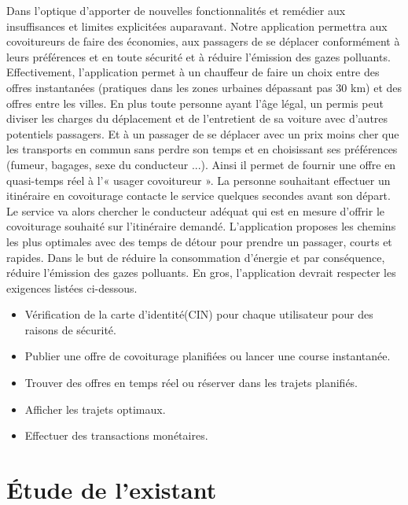Dans l'optique d'apporter de nouvelles fonctionnalités et remédier aux insuffisances et limites explicitées auparavant. Notre application permettra aux covoitureurs de faire des économies, aux passagers de se déplacer conformément à leurs préférences et en toute sécurité et à réduire l’émission des gazes polluants.\newline
Effectivement, l'application permet à un chauffeur de faire un choix entre des offres instantanées (pratiques dans les zones urbaines dépassant pas 30 km) et des offres entre les villes. En plus toute personne ayant l'âge légal, un permis peut diviser les charges du déplacement et de l'entretient de sa voiture avec d'autres potentiels passagers. Et à un passager de se déplacer avec un prix moins cher que les transports en commun sans perdre son temps et en choisissant ses préférences (fumeur, bagages, sexe du conducteur ...). Ainsi il permet de fournir une offre en quasi-temps réel à l'« usager covoitureur ». La personne souhaitant effectuer un itinéraire en covoiturage contacte le service quelques secondes avant son départ. Le service va alors chercher le conducteur adéquat qui est en mesure d'offrir le covoiturage souhaité sur l'itinéraire demandé.\cite{cheikh2016optimisation}\newline
L'application proposes les chemins les plus optimales avec des temps de détour pour prendre un passager, courts et rapides. Dans le but de réduire la consommation d’énergie et par conséquence, réduire l’émission des gazes polluants.
En gros, l'application devrait respecter les exigences listées ci-dessous.
\begin{itemize}
	\item Vérification de la carte d'identité(CIN) pour chaque utilisateur pour des raisons de sécurité.
	\item Publier une offre de covoiturage planifiées ou lancer une course instantanée.
	\item Trouver des offres en temps réel ou réserver dans les trajets planifiés.
	\item Afficher les trajets optimaux.
	\item Effectuer des transactions monétaires.
\end{itemize}

\section{Étude de l'existant}

